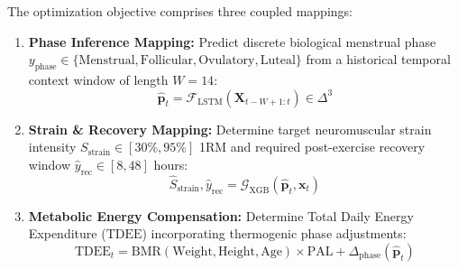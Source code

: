 \documentclass[conference]{IEEEtran}
\begin{document}
The optimization objective comprises three coupled mappings:
\begin{enumerate}
    \item \textbf{Phase Inference Mapping:} Predict discrete biological menstrual phase $y_{\text{phase}} \in \{\text{Menstrual}, \text{Follicular}, \text{Ovulatory}, \text{Luteal}\}$ from a historical temporal context window of length $W = 14$:
    \begin{equation}
    \hat{\mathbf{p}}_t = \mathcal{F}_{\text{LSTM}}(\mathbf{X}_{t-W+1:t}) \in \Delta^3
    \end{equation}
    \item \textbf{Strain \& Recovery Mapping:} Determine target neuromuscular strain intensity $S_{\text{strain}} \in [30\%, 95\%]$ 1RM and required post-exercise recovery window $\hat{y}_{\text{rec}} \in [8, 48]$ hours:
    \begin{equation}
    \hat{S}_{\text{strain}}, \hat{y}_{\text{rec}} = \mathcal{G}_{\text{XGB}}(\hat{\mathbf{p}}_t, \mathbf{x}_t)
    \end{equation}
    \item \textbf{Metabolic Energy Compensation:} Determine Total Daily Energy Expenditure ($\text{TDEE}$) incorporating thermogenic phase adjustments:
    \begin{equation}
    \text{TDEE}_t = \text{BMR}(\text{Weight}, \text{Height}, \text{Age}) \times \text{PAL} + \Delta_{\text{phase}}(\hat{\mathbf{p}}_t)
    \end{equation}
\end{enumerate}
\end{document}
